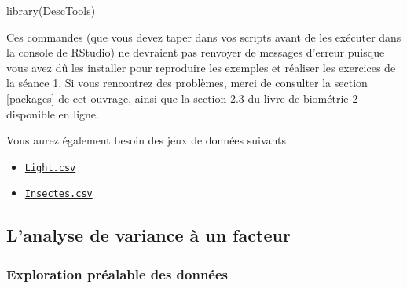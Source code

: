 \documentclass[
  a4paper,
]{article}
\newenvironment{Shaded}{\begin{snugshade}}{\end{snugshade}}
\newcommand{\FunctionTok}[1]{\textcolor[rgb]{0.39,0.29,0.61}{#1}}
\newcommand{\NormalTok}[1]{\textcolor[rgb]{0.12,0.11,0.11}{#1}}
\providecommand{\tightlist}{%
  \setlength{\itemsep}{0pt}\setlength{\parskip}{0pt}}
\begin{document}
\begin{Shaded}
\begin{Highlighting}[]
\FunctionTok{library}\NormalTok{(DescTools)}
\end{Highlighting}
\end{Shaded}

Ces commandes (que vous devez taper dans vos scripts avant de les exécuter dans la console de RStudio) ne devraient pas renvoyer de messages d'erreur puisque vous avez dû les installer pour reproduire les exemples et réaliser les exercices de la séance 1. Si vous rencontrez des problèmes, merci de consulter la section \ref{packages} de cet ouvrage, ainsi que \href{https://besibo.github.io/Biometrie2/bases.html\#charger-un-package-en-memoire}{la section 2.3} du livre de biométrie 2 disponible en ligne.

Vous aurez également besoin des jeux de données suivants :

\begin{itemize}
\tightlist
\item
  \href{https://besibo.github.io/Biometrie3/data/Light.csv}{\texttt{Light.csv}}
\item
  \href{https://besibo.github.io/Biometrie3/data/Insectes.csv}{\texttt{Insectes.csv}}
\end{itemize}

\hypertarget{lanalyse-de-variance-uxe0-un-facteur}{%
\subsection{L'analyse de variance à un facteur}\label{lanalyse-de-variance-uxe0-un-facteur}}

\hypertarget{exploration-pruxe9alable-des-donnuxe9es-1}{%
\subsubsection{Exploration préalable des données}\label{exploration-pruxe9alable-des-donnuxe9es-1}}
\end{document}
